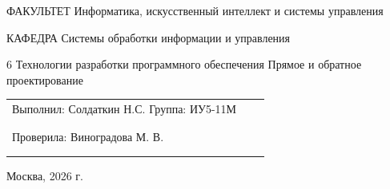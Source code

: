 \newcommand{\baumanAuthors}[3]{%
	\par
	\noindent
	\begingroup
	\setlength{\parindent}{0pt}%
	\setlength{\leftskip}{0pt}%
	\baumanfont
	\mdseries
	\fontsize{12}{14}\selectfont

	\setlength{\tabcolsep}{3pt}%

	\begin{tabularx}{\dimexpr\linewidth-20mm\relax}{%
		@{}
		>{\raggedright\arraybackslash}X
		>{\centering\arraybackslash}p{18mm}
		>{\centering\arraybackslash}p{18mm}
		@{}
		}
		Выполнил: #2\newline
		Группа: #1
		 &
		\shortstack[c]{%
		\rule{16mm}{0.4pt} \\[-1mm]
		{\fontsize{9}{11}\selectfont (подпись)}
		}
		 &
		\shortstack[c]{%
		\rule{16mm}{0.4pt} \\[-1mm]
		{\fontsize{9}{11}\selectfont (дата)}
		}
		\\[10mm]

		Проверила: #3
		 &
		\shortstack[c]{%
		\rule{16mm}{0.4pt} \\[-1mm]
		{\fontsize{9}{11}\selectfont (подпись)}
		}
		 &
		\shortstack[c]{%
		\rule{16mm}{0.4pt} \\[-1mm]
		{\fontsize{9}{11}\selectfont (дата)}
		}
	\end{tabularx}

	\endgroup
	\par
}

\newcommand{\baumanPlace}[2]{%
	\par
	\begingroup
	\centering
	\baumanfont
	\mdseries
	\fontsize{12}{14}\selectfont
	#1, #2 г.%
	\par
	\endgroup
}

\begin{titlepage}
	\thispagestyle{empty}
	\baumanUniversityHeader

	\baumanInfoRow
	{ФАКУЛЬТЕТ}
	{Информатика, искусственный интеллект и системы управления}

	\vspace{4mm}

	\baumanInfoRow
	{КАФЕДРА}
	{Системы обработки информации и управления}

	\vfill

	\baumanLabTitle
	{6}
	{Технологии разработки программного обеспечения}
	{Прямое и обратное проектирование}

	\vfill

	\baumanAuthors
	{ИУ5-11М}
	{Солдаткин Н.С.}
	{Виноградова М. В.}

	\vfill

	\baumanPlace{Москва}{2026}
\end{titlepage}

